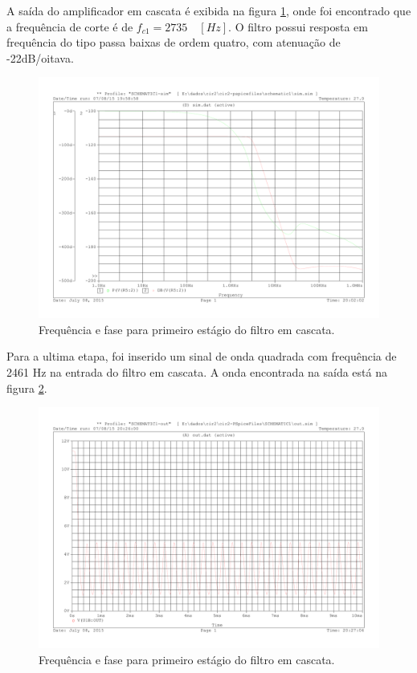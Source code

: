 A saída do amplificador em cascata é exibida na figura \ref{f_bode4}, onde foi encontrado que a frequência de corte é de $f_{c1} = 2735 \quad [Hz]$. O filtro possui resposta em frequência do tipo passa baixas de ordem quatro, com atenuação de -22dB/oitava.

\begin{figure}[H]
\centering
\includegraphics[scale=0.5]{Imagens/bode4.pdf}
\caption{Frequência e fase para primeiro estágio do filtro em cascata.}
\label{f_bode4}
\end{figure}

Para a ultima etapa, foi inserido um sinal de onda quadrada com frequência de 2461 Hz na entrada do filtro em cascata. A onda encontrada na saída está na figura \ref{f_square}.

\begin{figure}[H]
\centering
\includegraphics[scale=0.5]{Imagens/square.pdf}
\caption{Frequência e fase para primeiro estágio do filtro em cascata.}
\label{f_square}
\end{figure}
